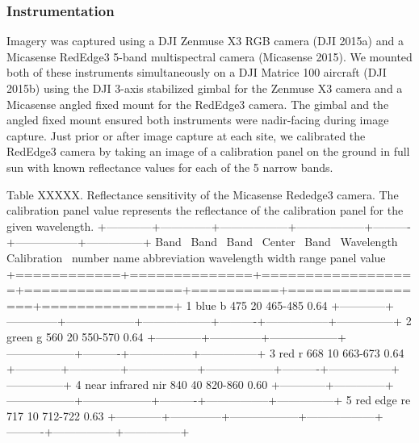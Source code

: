 \documentclass[]{article}
\begin{document}
\subsubsection{Instrumentation}\label{instrumentation}

Imagery was captured using a DJI Zenmuse X3 RGB camera (DJI 2015a) and a
Micasense RedEdge3 5-band multispectral camera (Micasense 2015). We
mounted both of these instruments simultaneously on a DJI Matrice 100
aircraft (DJI 2015b) using the DJI 3-axis stabilized gimbal for the
Zenmuse X3 camera and a Micasense angled fixed mount for the RedEdge3
camera. The gimbal and the angled fixed mount ensured both instruments
were nadir-facing during image capture. Just prior or after image
capture at each site, we calibrated the RedEdge3 camera by taking an
image of a calibration panel on the ground in full sun with known
reflectance values for each of the 5 narrow bands.

Table XXXXX. Reflectance sensitivity of the Micasense Rededge3 camera.
The calibration panel value represents the reflectance of the
calibration panel for the given wavelength.
+------------+--------------+------------------+------------------+----------+-----------------+---------------+
\textbar{} Band~ \textbar{} Band~ \textbar{} Band~ \textbar{} Center~
\textbar{} Band~ \textbar{} Wavelength~ \textbar{} Calibration~
\textbar{} \textbar{} number \textbar{} name \textbar{} abbreviation
\textbar{} wavelength \textbar{} width \textbar{} range \textbar{} panel
value \textbar{}
+============+==============+==================+==================+==========+=================+===============+
\textbar{} 1 \textbar{}blue \textbar{}b \textbar{} 475 \textbar{} 20
\textbar{} 465-485 \textbar{} 0.64 \textbar{}
+------------+--------------+------------------+------------------+----------+-----------------+---------------+
\textbar{} 2 \textbar{}green \textbar{}g \textbar{} 560 \textbar{} 20
\textbar{} 550-570 \textbar{} 0.64 \textbar{}
+------------+--------------+------------------+------------------+----------+-----------------+---------------+
\textbar{} 3 \textbar{}red \textbar{}r \textbar{} 668 \textbar{} 10
\textbar{} 663-673 \textbar{} 0.64 \textbar{}
+------------+--------------+------------------+------------------+----------+-----------------+---------------+
\textbar{} 4 \textbar{}near infrared \textbar{}nir \textbar{} 840
\textbar{} 40 \textbar{} 820-860 \textbar{} 0.60 \textbar{}
+------------+--------------+------------------+------------------+----------+-----------------+---------------+
\textbar{} 5 \textbar{}red edge \textbar{}re \textbar{} 717 \textbar{}
10 \textbar{} 712-722 \textbar{} 0.63 \textbar{}
+------------+--------------+------------------+------------------+----------+-----------------+---------------+
\end{document}
